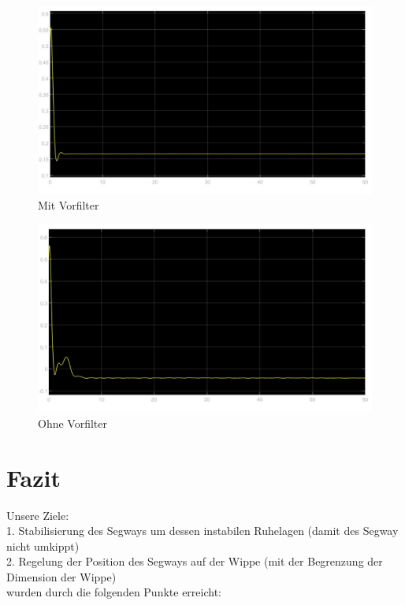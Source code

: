 \documentclass[pdf]{ifacconf}
\begin{document}
\begin{figure}[h]	
\centerline{\includegraphics[width=\linewidth]{Bilder/Plots/MitVorfilter.jpg}}
	\caption{Mit Vorfilter}
	\label{fig:MitVorfilter}
\end{figure}

\begin{figure}[h]	
\centerline{\includegraphics[width=\linewidth]{Bilder/Plots/OhneVorfilter.jpg}}	
	\caption{Ohne Vorfilter}
	\label{fig:OhneVorfilter}
\end{figure}



\section{Fazit}

Unsere Ziele: \\1. Stabilisierung des Segways um dessen instabilen Ruhelagen (damit des Segway nicht umkippt) \\2. Regelung der Position des Segways auf der Wippe (mit der Begrenzung der Dimension der Wippe) \\wurden durch die folgenden Punkte erreicht:
\end{document}

